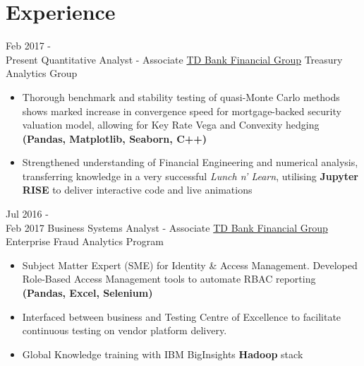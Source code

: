\documentclass[letterpaper]{twentysecondcv} %
\begin{document}
\section{Experience}

\begin{twenty} %
	\twentyitem
    	{Feb 2017 - \\ Present}
        {Quantitative Analyst - Associate}
        {\href{http://www.td.com/}{TD Bank Financial Group}}
        {Treasury Analytics Group}
        {
        {\begin{itemize}
        \item Thorough benchmark and stability testing of quasi-Monte Carlo methods shows marked increase in convergence speed for mortgage-backed security valuation model, allowing for Key Rate Vega and Convexity hedging \textbf{(Pandas, Matplotlib, Seaborn, C++)}
        \item Strengthened understanding of Financial Engineering and numerical analysis, transferring knowledge in a very successful \emph{Lunch n' Learn}, utilising \textbf{Jupyter RISE} to deliver interactive code and live animations
    \end{itemize}}
        }
        
    \twentyitem
   		{Jul 2016 - \\
   		Feb 2017}
        {Business Systems Analyst - Associate}
        {\href{http://www.td.com/}{TD Bank Financial Group}}
        {Enterprise Fraud Analytics Program}
        {
        {\begin{itemize}
        \item Subject Matter Expert (SME) for Identity \& Access Management. Developed Role-Based Access Management tools to automate RBAC reporting \textbf{(Pandas, Excel, Selenium)}
        \item Interfaced between business and Testing Centre of Excellence to facilitate continuous testing on vendor platform delivery.
        \item Global Knowledge training with IBM BigInsights \textbf{Hadoop} stack
    \end{itemize}}
        }
        

\end{twenty}
\end{document}
